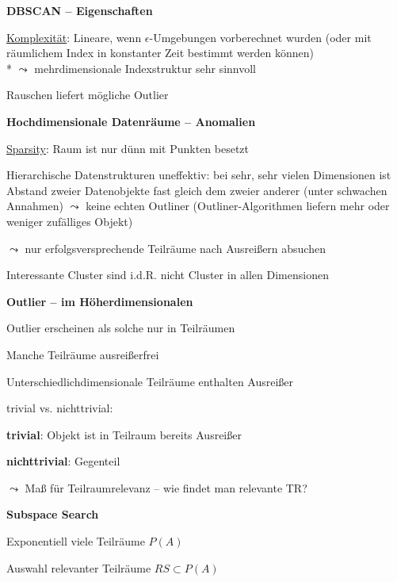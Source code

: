 \textbf{DBSCAN -- Eigenschaften}
\begin{items}
	\item \underline{Komplexität}: Lineare, wenn \( \epsilon \)-Umgebungen vorberechnet wurden (oder mit räumlichem Index in konstanter Zeit bestimmt werden können) \\* \( \leadsto \) mehrdimensionale Indexstruktur sehr sinnvoll
	\item Rauschen liefert mögliche Outlier
\end{items}

\textbf{Hochdimensionale Datenräume -- Anomalien}
\begin{items}
	\item \underline{Sparsity}: Raum ist nur dünn mit Punkten besetzt
	\item Hierarchische Datenstrukturen uneffektiv: bei sehr, sehr vielen Dimensionen ist Abstand zweier Datenobjekte fast gleich dem zweier anderer (unter schwachen Annahmen) \( \leadsto \) keine echten Outliner (Outliner-Algorithmen liefern mehr oder weniger zufälliges Objekt)
	\item \( \leadsto \) nur erfolgsversprechende Teilräume nach Ausreißern absuchen
	\item Interessante Cluster sind i.d.R. nicht Cluster in allen Dimensionen
\end{items}

\textbf{Outlier -- im Höherdimensionalen}
\begin{items}
	\item Outlier erscheinen als solche nur in Teilräumen
	\item Manche Teilräume ausreißerfrei
	\item Unterschiedlichdimensionale Teilräume enthalten Ausreißer
	\item trivial vs. nichttrivial:
	\begin{enumeration}
		\item \textbf{trivial}: Objekt ist in Teilraum bereits Ausreißer
		\item \textbf{nichttrivial}: Gegenteil
	\end{enumeration}
	\item \( \leadsto \) Maß für Teilraumrelevanz -- wie findet man relevante TR?
\end{items}

\textbf{Subspace Search}
\begin{items}
	\item Exponentiell viele Teilräume \( P(A) \)
	\item Auswahl relevanter Teilräume \( RS \subset P(A) \)
\end{items}

